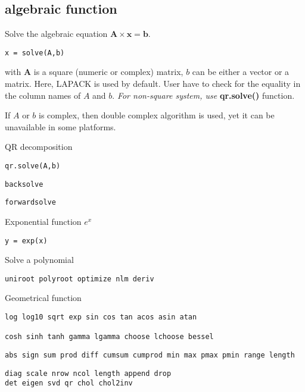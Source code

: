\subsection{algebraic function}
\label{sec:algebraic-function}

\textbullet Solve the algebraic equation $\mathbf{A\times x} =
\mathbf{b}$.
\begin{lstlisting}
x = solve(A,b)
\end{lstlisting}
with $\mathbf{A}$ is a square (numeric or complex) matrix, $b$ can be
either a vector or a matrix. Here, LAPACK is used by default. User
have to check for the equality in the column names of $A$ and
$b$. {\it For non-square system, use} {\bf qr.solve()} function.

If $A$ or $b$ is complex, then double complex algorithm is used, yet
it can be unavailable in some platforms.

\textbullet QR decomposition
\begin{lstlisting}
qr.solve(A,b)
\end{lstlisting}

\textbullet 
\begin{lstlisting}
backsolve
\end{lstlisting}

\begin{lstlisting}
forwardsolve
\end{lstlisting}
\textbullet Exponential function $e^x$
\begin{lstlisting}
y = exp(x)
\end{lstlisting}

\textbullet Solve a polynomial
\begin{lstlisting}
uniroot polyroot optimize nlm deriv 
\end{lstlisting}

\textbullet Geometrical function
\begin{lstlisting}
log log10 sqrt exp sin cos tan acos asin atan 

cosh sinh tanh gamma lgamma choose lchoose bessel
\end{lstlisting}

\begin{lstlisting}
abs sign sum prod diff cumsum cumprod min max pmax pmin range length
\end{lstlisting}

\begin{lstlisting}
diag scale nrow ncol length append drop
det eigen svd qr chol chol2inv
\end{lstlisting}

